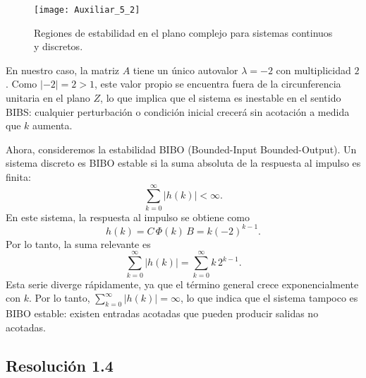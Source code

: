 \documentclass[
  11pt,
  letterpaper,
   addpoints,
  answers
  ]{exam}
\begin{document}
\begin{questions}
\begin{solution}
\begin{figure}[H]
    \centering
    \texttt{[image: Auxiliar\_5\_2]}
    \caption{Regiones de estabilidad en el plano complejo para sistemas continuos y discretos.}
    \label{fig:stability_regions}
\end{figure}
En nuestro caso, la matriz $A$ tiene un único autovalor $\lambda = -2$ con multiplicidad $2$. Como $|-2| = 2 > 1$, este valor propio se encuentra fuera de la circunferencia unitaria en el plano $Z$, lo que implica que el sistema es inestable en el sentido BIBS: cualquier perturbación o condición inicial crecerá sin acotación a medida que $k$ aumenta.

Ahora, consideremos la estabilidad BIBO (Bounded-Input Bounded-Output). Un sistema discreto es BIBO estable si la suma absoluta de la respuesta al impulso es finita:
\begin{equation}
\sum_{k=0}^{\infty} |h(k)| < \infty.
\end{equation}
En este sistema, la respuesta al impulso se obtiene como
\begin{equation}
h(k) = C\,\Phi(k)\,B = k(-2)^{k-1}.
\end{equation}
Por lo tanto, la suma relevante es
\begin{equation}
\sum_{k=0}^{\infty} |h(k)| = \sum_{k=0}^{\infty} k\,2^{k-1}.
\end{equation}
Esta serie diverge rápidamente, ya que el término general crece exponencialmente con $k$. Por lo tanto, $\sum_{k=0}^{\infty} |h(k)| = \infty$, lo que indica que el sistema tampoco es BIBO estable: existen entradas acotadas que pueden producir salidas no acotadas.

\subsection*{Resolución 1.4}


\end{solution}
\end{questions}
\end{document}
